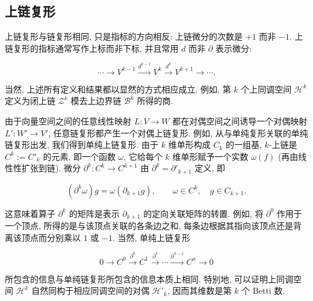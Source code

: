 \subsection{{上链复形}}\label{sec:cochain-complexes}

{上链复形与链复形相同, 只是指标的方向相反: 上链微分的次数是 $+1$ 而非 $-1$. 上链复形的指标通常写作上标而非下标, 并且常用 $d$ 而非 $\partial$ 表示微分:}

\[
\cdots\to V^{k-1}\xrightarrow{d^{k-1}}V^k\xrightarrow{d^k}V^{k+1}\to\cdots.
\]

{当然, 上述所有定义和结果都以显然的方式相应成立. 例如, 第 $k$ 个上同调空间 $\mathcal H^k$ 定义为闭上链 $\mathcal Z^k$ 模去上边界链 $\mathcal B^k$ 所得的商.}

{由于向量空间之间的任意线性映射 $L:V\to W$ 都在对偶空间之间诱导一个对偶映射 $L':W'\to V'$, 任意链复形都产生一个对偶上链复形. 例如, 从与单纯复形关联的单纯链复形出发, 我们得到单纯上链复形. 由于 $k$ 维单形构成 $C_k$ 的一组基, $k$-上链是 $C^k:=C'_k$ 的元素, 即一个函数 $\omega$, 它给每个 $k$ 维单形赋予一个实数 $\omega(f)$ (再由线性性扩张到链). 微分 $\partial^k:C^k\to C^{k+1}$ 由 $\partial^k=\partial'_{k+1}$ 定义, 即}

\[
(\partial^k\omega)g=\omega(\partial_{k+1}g),\qquad \omega\in C^k,\quad g\in C_{k+1}.
\]

{这意味着算子 $\partial^k$ 的矩阵是表示 $\partial_{k+1}$ 的定向关联矩阵的转置. 例如, 将 $\partial^0$ 作用于一个顶点, 所得的是与该顶点关联的各条边之和, 每条边根据其指向该顶点还是背离该顶点而分别乘以 $1$ 或 $-1$. 当然, 单纯上链复形}

\begin{equation}\label{eq:simplicial-cochain-complex}
0\to C^0\xrightarrow{\partial^0}C^1\xrightarrow{\partial^1}\cdots\xrightarrow{\partial^{n-1}}C^n\to0
\end{equation}

{所包含的信息与单纯链复形所包含的信息本质上相同. 特别地, 可以证明上同调空间 $\mathcal H^k$ 自然同构于相应同调空间的对偶 $\mathcal H'_k$, 因而其维数是第 $k$ 个 Betti 数.}

